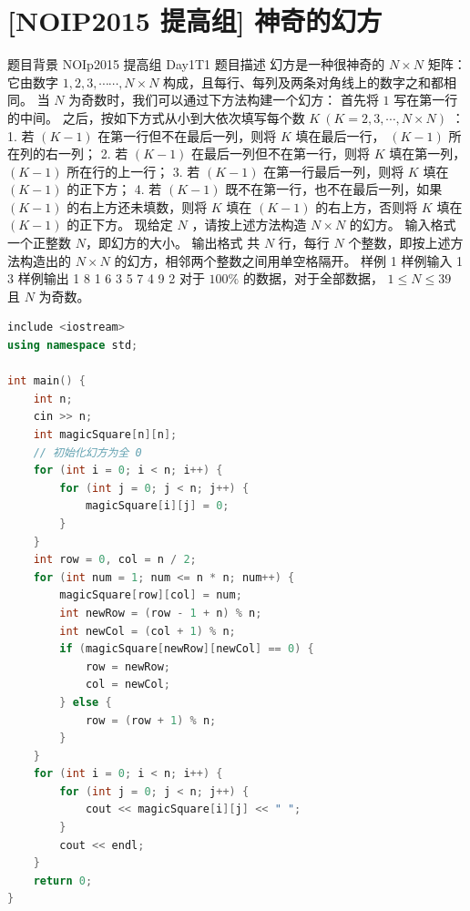 \documentclass[12pt,twiside,a4paper]{ctexbook}
\numberwithin{chapter}{part}
\begin{document}
\section{[NOIP2015 提高组] 神奇的幻方}
题目背景
NOIp2015 提高组 Day1T1
 题目描述
幻方是一种很神奇的 $N\times N$ 矩阵：它由数字 $1,2,3,\cdots \cdots ,N \times N$ 构成，且每行、每列及两条对角线上的数字之和都相同。
当 $N$ 为奇数时，我们可以通过下方法构建一个幻方：
首先将 $1$ 写在第一行的中间。
之后，按如下方式从小到大依次填写每个数 $K \ (K=2,3,\cdots,N \times N)$ ：
1. 若 $(K-1)$ 在第一行但不在最后一列，则将 $K$ 填在最后一行， $(K-1)$ 所在列的右一列；
2. 若 $(K-1)$ 在最后一列但不在第一行，则将 $K$ 填在第一列， $(K-1)$ 所在行的上一行；
3. 若 $(K-1)$ 在第一行最后一列，则将 $K$ 填在 $(K-1)$ 的正下方；
4. 若 $(K-1)$ 既不在第一行，也不在最后一列，如果 $(K-1)$ 的右上方还未填数，则将 $K$ 填在 $(K-1)$ 的右上方，否则将 $K$ 填在 $(K-1)$ 的正下方。
现给定 $N$ ，请按上述方法构造 $N \times N$ 的幻方。
 输入格式
一个正整数 $N$，即幻方的大小。
 输出格式
共 $N$ 行，每行 $N$ 个整数，即按上述方法构造出的 $N \times N$ 的幻方，相邻两个整数之间用单空格隔开。
 样例 1
 样例输入 1
3
 样例输出 1
8 1 6
3 5 7
4 9 2
对于 $100\%$ 的数据，对于全部数据， $1 \leq N \leq 39$ 且 $N$ 为奇数。
\begin{lstlisting}[language=c++,breaklines=true]
include <iostream>
using namespace std;

int main() {
    int n;
    cin >> n;
    int magicSquare[n][n];
    // 初始化幻方为全 0
    for (int i = 0; i < n; i++) {
        for (int j = 0; j < n; j++) {
            magicSquare[i][j] = 0;
        }
    }
    int row = 0, col = n / 2;
    for (int num = 1; num <= n * n; num++) {
        magicSquare[row][col] = num;
        int newRow = (row - 1 + n) % n;
        int newCol = (col + 1) % n;
        if (magicSquare[newRow][newCol] == 0) {
            row = newRow;
            col = newCol;
        } else {
            row = (row + 1) % n;
        }
    }
    for (int i = 0; i < n; i++) {
        for (int j = 0; j < n; j++) {
            cout << magicSquare[i][j] << " ";
        }
        cout << endl;
    }
    return 0;
}
\end{lstlisting}
\end{document}
